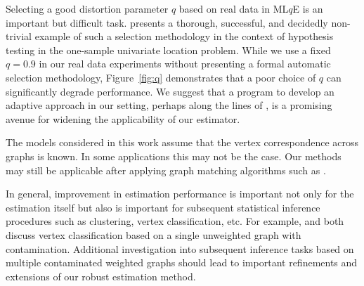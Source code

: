 Selecting a good distortion parameter $q$ based on real data in ML$q$E is an important but difficult task.
\citet{qin2017robust} presents a thorough, successful, and decidedly non-trivial example of such a selection methodology in the context of hypothesis testing in the one-sample univariate location problem.
While we use a fixed $q = 0.9$ in our real data experiments without presenting a formal automatic selection methodology,
Figure~\ref{fig:q} demonstrates that a poor choice of $q$ can significantly degrade performance.
We suggest that a program to develop an adaptive approach in our setting,
perhaps along the lines of \citep{qin2017robust}, is a promising avenue for widening the applicability of our estimator.

The models considered in this work assume that the vertex correspondence across graphs is known. In some applications this may not be the case.  
Our methods may still be applicable after applying graph matching algorithms such as \citep{lyzinski2016graph, lyzinski2015spectral, lyzinski2014seeded, vogelstein2015fast}.


In general, improvement in estimation performance is important not only for the estimation itself but also is important for subsequent statistical inference procedures such as clustering, vertex classification, etc.
For example, \citet{priebe2015statistical} and \citet{chen2016robust} both discuss vertex classification based on a single unweighted graph with contamination.
Additional investigation into subsequent inference tasks based on multiple contaminated weighted graphs should lead to important refinements and extensions of our robust estimation method.
